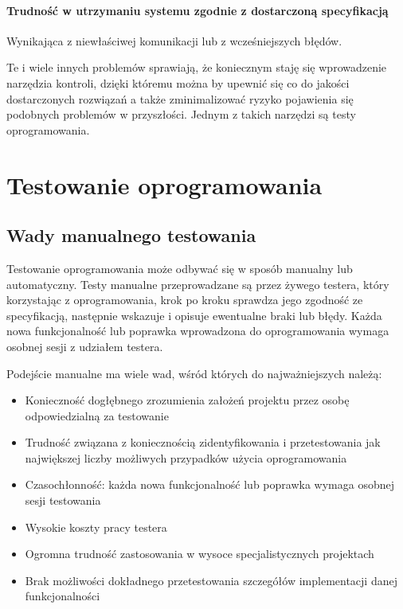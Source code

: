 	  \paragraph{Trudność w utrzymaniu systemu zgodnie z dostarczoną specyfikacją}
	    Wynikająca z niewłaściwej komunikacji lub z wcześniejszych błędów.
	
	Te i wiele innych problemów sprawiają, że koniecznym staję się wprowadzenie narzędzia kontroli, dzięki któremu można by upewnić się co do jakości dostarczonych rozwiązań a także zminimalizować ryzyko pojawienia się podobnych problemów w przyszłości. Jednym z takich narzędzi są testy oprogramowania.
	  
	\section{Testowanie oprogramowania}
	  \subsection{Wady manualnego testowania}
  	  Testowanie oprogramowania może odbywać się w sposób manualny lub automatyczny. Testy manualne przeprowadzane są przez żywego testera, który korzystając z oprogramowania, krok po kroku sprawdza jego zgodność ze specyfikacją, następnie wskazuje i opisuje ewentualne braki lub błędy. Każda nowa funkcjonalność lub poprawka wprowadzona do oprogramowania wymaga osobnej sesji z udziałem testera. 
	  
  	  Podejście manualne ma wiele wad, wśród których do najważniejszych należą:
	  
  	  \begin{itemize}
  	    \item Konieczność dogłębnego zrozumienia założeń projektu przez osobę odpowiedzialną za testowanie
  	    \item Trudność związana z koniecznością zidentyfikowania i przetestowania jak największej liczby możliwych przypadków użycia oprogramowania
  	    \item Czasochłonność: każda nowa funkcjonalność lub poprawka wymaga osobnej sesji testowania
  	   	\item Wysokie koszty pracy testera
  	   	\item Ogromna trudność zastosowania w wysoce specjalistycznych projektach
  	   	\item Brak możliwości dokładnego przetestowania szczegółów implementacji danej funkcjonalności
  	  \end{itemize}
	  
